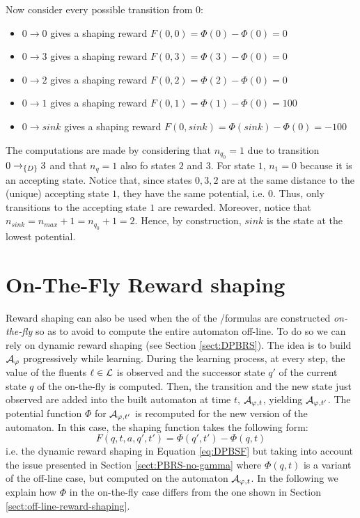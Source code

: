 \begin{example}
	Now consider every possible transition from $0$:
	\begin{itemize}
		\item $0\to 0$ gives a shaping reward $F(0, 0) = \Phi(0) - \Phi(0) = 0$
		\item $0\to 3$ gives a shaping reward $F(0, 3) = \Phi(3) - \Phi(0) = 0$
		\item $0\to 2$ gives a shaping reward $F(0, 2) = \Phi(2) - \Phi(0) = 0$
		\item $0\to 1$ gives a shaping reward $F(0, 1) = \Phi(1) - \Phi(0) = 100$
		\item $0\to sink$ gives a shaping reward $F(0, sink) = \Phi(sink) - \Phi(0) = -100$
	\end{itemize}
	The computations are made by considering that $n_{q_0} = 1$ due to transition $0 \to_{\{D\}} 3$ and that $n_q=1$ also fo states $2$ and $3$. For state $1$, $n_1 = 0$ because it is an accepting state.
	Notice that, since states $0, 3, 2$ are at the same distance to the (unique) accepting state $1$, they have the same potential, i.e. $0$. Thus, only transitions to the accepting state $1$ are rewarded. Moreover, notice that $n_{sink} = n_{max} + 1 = n_{q_0} + 1 = 2$. Hence, by construction, $sink$ is the state at the lowest potential.
	
	
	
\end{example}

\section{On-The-Fly Reward shaping}\label{sect:on-the-fly-reward-shaping}
Reward shaping can also be used when the \DFAs of the \LTLf /\LDLf formulas are constructed \emph{on-the-fly} \citep{AAAI1817342} so as to avoid to compute the entire automaton off-line. To do so we can rely on dynamic reward shaping (see Section \ref{sect:DPBRS}).
The idea is to build $\mathcal{A}_{\varphi}$ progressively while learning. During the learning process, at every step, the value of the fluents $\ell \in \mathcal{L}$ is observed and the successor state $q'$ of the current state $q$ of the \DFA on-the-fly is computed. 
Then, the transition and the new state just observed are added into the built automaton at time $t$, $\mathcal{A}_{\varphi, t}$, yielding $\mathcal{A}_{\varphi, t'}$. The potential function $\Phi$ for $\mathcal{A}_{\varphi, t'}$ is recomputed for the new version of the automaton. In this case, the shaping function takes the following form: 
\begin{equation}
F(q, t, a, q', t') = \Phi(q', t') - \Phi(q, t)
\end{equation}
i.e. the dynamic reward shaping in Equation \ref{eq:DPBSF} but taking into account the issue presented in Section \ref{sect:PBRS-no-gamma}
where $\Phi(q, t)$ is a variant of the off-line case, but computed on the automaton $\mathcal{A}_{\varphi, t}$. In the following we explain how $\Phi$ in the on-the-fly case differs from the one shown in Section \ref{sect:off-line-reward-shaping}.

